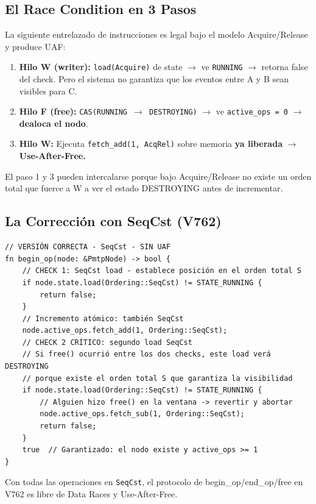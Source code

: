 \subsection{El Race Condition en 3 Pasos}

La siguiente entrelazado de instrucciones es legal bajo el modelo Acquire/Release
y produce UAF:

\begin{enumerate}
\item \textbf{Hilo W (writer):} \texttt{load(Acquire)} de state $\to$ ve \texttt{RUNNING} $\to$ retorna false del check.
   Pero el sistema no garantiza que los eventos entre A y B sean visibles para C.

\item \textbf{Hilo F (free):} \texttt{CAS(RUNNING $\to$ DESTROYING)} $\to$ ve \texttt{active\_ops = 0} $\to$
   \textbf{dealoca el nodo}.

\item \textbf{Hilo W:} Ejecuta \texttt{fetch\_add(1, AcqRel)} sobre memoria \textbf{ya liberada} $\to$
   \textbf{Use-After-Free.}
\end{enumerate}

El paso 1 y 3 pueden intercalarse porque bajo Acquire/Release no existe un
orden total que fuerce a W a ver el estado DESTROYING antes de incrementar.

\subsection{La Corrección con SeqCst (V762)}

\begin{verbatim}
// VERSIÓN CORRECTA - SeqCst - SIN UAF
fn begin_op(node: &PmtpNode) -> bool {
    // CHECK 1: SeqCst load - establece posición en el orden total S
    if node.state.load(Ordering::SeqCst) != STATE_RUNNING {
        return false;
    }
    // Incremento atómico: también SeqCst
    node.active_ops.fetch_add(1, Ordering::SeqCst);
    // CHECK 2 CRÍTICO: segundo load SeqCst
    // Si free() ocurrió entre los dos checks, este load verá DESTROYING
    // porque existe el orden total S que garantiza la visibilidad
    if node.state.load(Ordering::SeqCst) != STATE_RUNNING {
        // Alguien hizo free() en la ventana -> revertir y abortar
        node.active_ops.fetch_sub(1, Ordering::SeqCst);
        return false;
    }
    true  // Garantizado: el nodo existe y active_ops >= 1
}
\end{verbatim}

\begin{theorem}

Con todas las operaciones en \texttt{SeqCst}, el protocolo de begin\_op/end\_op/free
en V762 es libre de Data Races y Use-After-Free.
\end{theorem}

